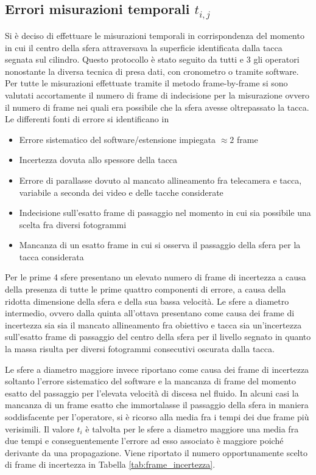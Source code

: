\documentclass[a4paper,11pt,oneside]{article}
\begin{document}
\subsection{Errori misurazioni temporali $t_{i,j}$}
Si è deciso di effettuare le misurazioni temporali in corrispondenza del momento in cui il centro della sfera attraversava la superficie identificata dalla tacca segnata sul cilindro. Questo protocollo è stato seguito da tutti e 3 gli operatori nonostante la diversa tecnica di presa dati, con cronometro o tramite software.
Per tutte le misurazioni effettuate tramite il metodo frame-by-frame si sono valutati accortamente il numero di frame di indecisione per la misurazione ovvero il numero di frame nei quali era possibile che la sfera avesse oltrepassato la tacca.
Le differenti fonti di errore si identificano in
\begin{itemize}
    \item Errore sistematico del software/estensione impiegata $\approx 2 $ frame
    \item Incertezza dovuta allo spessore della tacca
    \item Errore di parallasse dovuto al mancato allineamento fra telecamera e tacca, variabile a seconda dei video e delle tacche considerate
    \item Indecisione sull'esatto frame di passaggio nel momento in cui sia possibile una scelta fra diversi fotogrammi
    \item Mancanza di un esatto frame in cui si osserva il passaggio della sfera per la tacca considerata
\end{itemize}
Per le prime 4 sfere presentano un elevato numero di frame di incertezza a causa della presenza di tutte le prime quattro componenti di errore, a causa della ridotta dimensione della sfera e della sua bassa velocità.
Le sfere a diametro intermedio, ovvero dalla quinta all'ottava presentano come causa dei frame di incertezza sia sia il mancato allineamento fra obiettivo e tacca sia un'incertezza sull'esatto frame di passaggio del centro della sfera per il livello segnato in quanto la massa risulta per diversi fotogrammi consecutivi oscurata dalla tacca.

Le sfere a diametro maggiore invece riportano come causa dei frame di incertezza soltanto l'errore sistematico del software e la mancanza di frame del momento esatto del passaggio per l'elevata velocità di discesa nel fluido.
In alcuni casi la mancanza di un frame esatto che immortalasse il passaggio della sfera in maniera soddisfacente per l'operatore, si è ricorso alla media fra i tempi dei due frame più verisimili. Il valore $t_i$ è talvolta per le sfere a diametro maggiore una media fra due tempi e conseguentemente l'errore ad esso associato è maggiore poiché derivante da una propagazione.
Viene riportato il numero opportunamente scelto di frame di incertezza in Tabella \ref{tab:frame_incertezza}.
\end{document}
